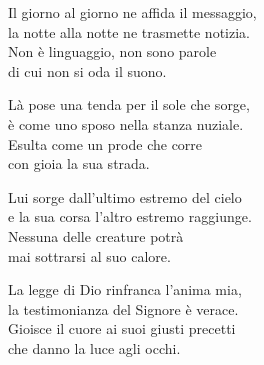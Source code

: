 

\spazio

\strofa Il giorno al giorno ne affida il messaggio,\\
la notte alla notte ne trasmette notizia.\\
Non è linguaggio, non sono parole\\
di cui non si oda il suono.

\spazio


\spazio

\strofa Là pose una tenda per il sole che sorge,\\
è come uno sposo nella stanza nuziale.\\
Esulta come un prode che corre\\
con gioia la sua strada.

\spazio


\spazio

\strofa Lui sorge dall'ultimo estremo del cielo\\
e la sua corsa l'altro estremo raggiunge.\\
Nessuna delle creature potrà\\
mai sottrarsi al suo calore.

\spazio


\spazio

\strofa La legge di Dio rinfranca l'anima mia,\\
la testimonianza del Signore è verace.\\
Gioisce il cuore ai suoi giusti precetti\\
che danno la luce agli occhi.

\spazio

